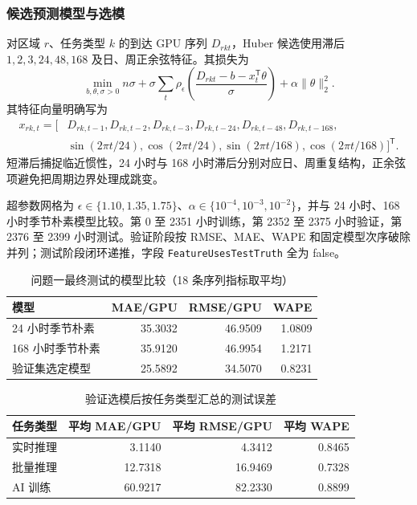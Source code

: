 \documentclass[withoutpreface,bwprint]{cumcmthesis}
\begin{document}
\subsubsection{候选预测模型与选模}
对区域 $r$、任务类型 $k$ 的到达 GPU 序列 $D_{rkt}$，Huber 候选使用滞后 $1,2,3,24,48,168$ 及日、周正余弦特征。其损失为
\begin{equation}
\min_{b,\theta,\sigma>0}n\sigma+\sigma\sum_t\rho_{\epsilon}\!\left(\frac{D_{rkt}-b-x_t^\mathsf T\theta}{\sigma}\right)+\alpha\|\theta\|_2^2.
\end{equation}
其特征向量明确写为
\begin{equation}
\begin{aligned}
x_{rk,t}=\big[&D_{rk,t-1},D_{rk,t-2},D_{rk,t-3},D_{rk,t-24},D_{rk,t-48},D_{rk,t-168},\\
&\sin(2\pi t/24),\cos(2\pi t/24),\sin(2\pi t/168),\cos(2\pi t/168)\big]^{\mathsf T}.
\end{aligned}
\end{equation}
短滞后捕捉临近惯性，24 小时与 168 小时滞后分别对应日、周重复结构，正余弦项避免把周期边界处理成跳变。

超参数网格为 $\epsilon\in\{1.10,1.35,1.75\}$、$\alpha\in\{10^{-4},10^{-3},10^{-2}\}$，并与 24 小时、168 小时季节朴素模型比较。第 0 至 2351 小时训练，第 2352 至 2375 小时验证，第 2376 至 2399 小时测试。验证阶段按 RMSE、MAE、WAPE 和固定模型次序破除并列；测试阶段闭环递推，字段 \texttt{FeatureUsesTestTruth} 全为 false。

\begin{table}[H]\centering
\caption{问题一最终测试的模型比较（18 条序列指标取平均）}\label{tab:q1model}
\begin{tabular}{lrrr}\toprule
模型 & MAE/GPU & RMSE/GPU & WAPE\\\midrule
24 小时季节朴素 & 35.3032 & 46.9509 & 1.0809\\
168 小时季节朴素 & 35.9120 & 46.9954 & 1.2171\\
验证集选定模型 & 25.5892 & 34.5070 & 0.8231\\\bottomrule
\end{tabular}
\end{table}

\begin{table}[H]\centering
\caption{验证选模后按任务类型汇总的测试误差}\label{tab:q1type}
\begin{tabular}{lrrr}\toprule
任务类型 & 平均 MAE/GPU & 平均 RMSE/GPU & 平均 WAPE\\\midrule
实时推理 & 3.1140 & 4.3412 & 0.8465\\
批量推理 & 12.7318 & 16.9469 & 0.7328\\
AI 训练 & 60.9217 & 82.2330 & 0.8899\\\bottomrule
\end{tabular}
\end{table}
\end{document}
